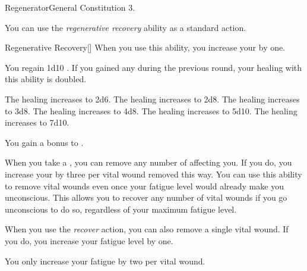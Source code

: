     \begin{feat}{Regenerator}{General}
        \featpre Constitution 3.

         You can use the \textit{regenerative recovery} ability as a standard action.
        \begin{activeability}{Regenerative Recovery}[]
            \rankline
            When you use this ability, you increase your  by one.

            You regain 1d10 .
            If you gained any  during the previous round, your healing with this ability is doubled.

            \rankline
             The healing increases to 2d6.
             The healing increases to 2d8.
             The healing increases to 3d8.
             The healing increases to 4d8.
             The healing increases to 5d10.
             The healing increases to 7d10.
        \end{activeability}

         You gain a  bonus to .

         When you take a , you can remove any number of  affecting you.
        If you do, you increase your  by three per vital wound removed this way.
        You can use this ability to remove vital wounds even once your fatigue level would already make you unconscious.
        This allows you to recover any number of vital wounds if you go unconscious to do so, regardless of your maximum fatigue level.

         When you use the \textit{recover} action, you can also remove a single vital wound.
        If you do, you increase your fatigue level by one.

         You only increase your fatigue by two per vital wound.
    \end{feat}

